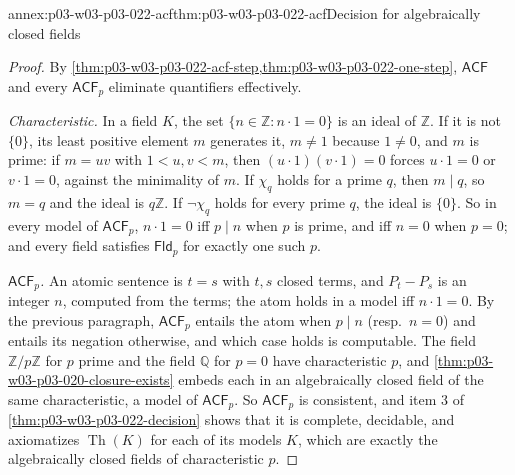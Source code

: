 \begin{annexitem}{annex:p03-w03-p03-022-acf}{thm:p03-w03-p03-022-acf}{Decision for algebraically closed fields}
\begin{proof}
By \cref{thm:p03-w03-p03-022-acf-step,thm:p03-w03-p03-022-one-step},
\(\mathsf{ACF}\) and every \(\mathsf{ACF}_p\) eliminate quantifiers
effectively.

\emph{Characteristic.} In a field \(K\), the set
\(\{n\in\mathbb Z:n\cdot1=0\}\) is an ideal of \(\mathbb Z\). If it is not
\(\{0\}\), its least positive element \(m\) generates it, \(m\ne1\) because
\(1\ne0\), and \(m\) is prime: if \(m=uv\) with \(1<u,v<m\), then
\((u\cdot1)(v\cdot1)=0\) forces \(u\cdot1=0\) or \(v\cdot1=0\), against the
minimality of \(m\). If \(\chi_q\) holds for a prime \(q\), then \(m\mid q\),
so \(m=q\) and the ideal is \(q\mathbb Z\). If \(\neg\chi_q\) holds for every
prime \(q\), the ideal is \(\{0\}\). So in every model of \(\mathsf{ACF}_p\),
\(n\cdot1=0\) iff \(p\mid n\) when \(p\) is prime, and iff \(n=0\) when
\(p=0\); and every field satisfies \(\mathsf{Fld}_p\) for exactly one such
\(p\).

\emph{\(\mathsf{ACF}_p\).} An atomic sentence is \(t=s\) with \(t,s\) closed
terms, and \(P_t-P_s\) is an integer \(n\), computed from the terms; the
atom holds in a model iff \(n\cdot1=0\). By the previous paragraph,
\(\mathsf{ACF}_p\) entails the atom when \(p\mid n\) (resp.\ \(n=0\)) and
entails its negation otherwise, and which case holds is computable. The
field \(\mathbb Z/p\mathbb Z\) for \(p\) prime and the field \(\mathbb Q\)
for \(p=0\) have characteristic \(p\), and
\cref{thm:p03-w03-p03-020-closure-exists} embeds each in an algebraically
closed field of the same characteristic, a model of \(\mathsf{ACF}_p\).
So \(\mathsf{ACF}_p\) is consistent, and item 3 of
\cref{thm:p03-w03-p03-022-decision} shows that it is complete, decidable,
and axiomatizes \(\operatorname{Th}(K)\) for each of its models \(K\), which
are exactly the algebraically closed fields of characteristic \(p\).


\end{proof}
\end{annexitem}
